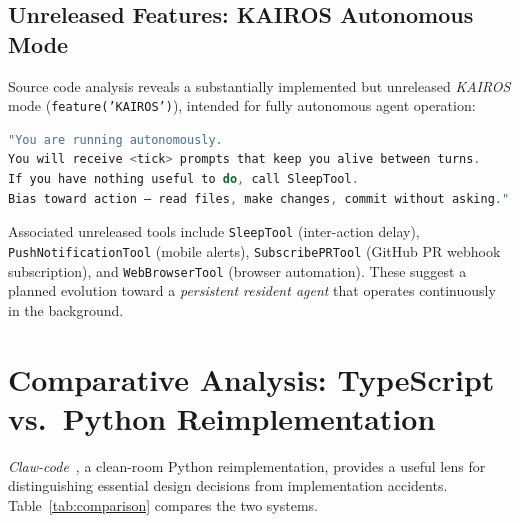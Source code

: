 \documentclass{article}
\newcommand{\code}[1]{\texttt{#1}}
\begin{document}
\subsection{Unreleased Features: KAIROS Autonomous Mode}

Source code analysis reveals a substantially implemented but unreleased \emph{KAIROS} mode (\code{feature('KAIROS')}), intended for fully autonomous agent operation:

\begin{lstlisting}[language=TypeScript, caption={KAIROS system prompt excerpt from \texttt{src/constants/prompts.ts}.}]
"You are running autonomously.
You will receive <tick> prompts that keep you alive between turns.
If you have nothing useful to do, call SleepTool.
Bias toward action — read files, make changes, commit without asking."
\end{lstlisting}

Associated unreleased tools include \code{SleepTool} (inter-action delay), \code{PushNotificationTool} (mobile alerts), \code{SubscribePRTool} (GitHub PR webhook subscription), and \code{WebBrowserTool} (browser automation). These suggest a planned evolution toward a \emph{persistent resident agent} that operates continuously in the background.

\section{Comparative Analysis: TypeScript vs.\ Python Reimplementation}
\label{sec:claw}

\emph{Claw-code}~\cite{clawcode2026}, a clean-room Python reimplementation, provides a useful lens for distinguishing essential design decisions from implementation accidents. Table~\ref{tab:comparison} compares the two systems.
\end{document}
